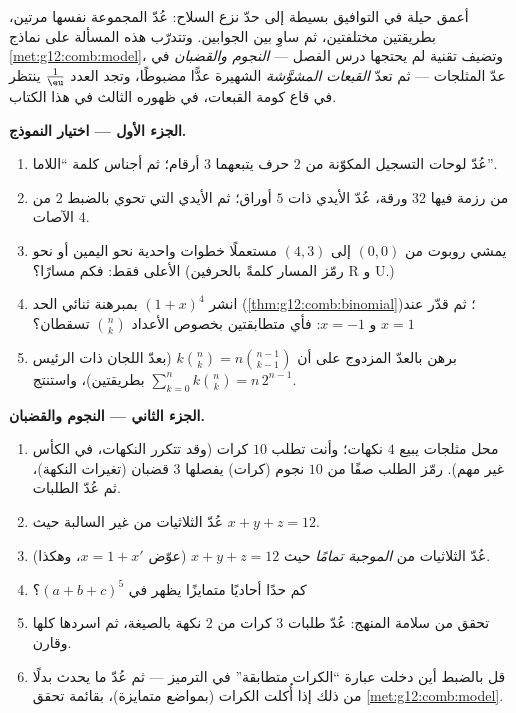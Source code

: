 \begin{problem}
\label{pb:g12:comb:1}
أعمق حيلة في التوافيق بسيطة إلى حدّ نزع السلاح: عُدّ
المجموعة نفسها مرتين، بطريقتين مختلفتين، ثم ساوِ
بين الجوابين. وتتدرّب هذه المسألة على نماذج
\cref{met:g12:comb:model}، وتضيف تقنية لم يحتجها درس
الفصل --- \emph{النجوم والقضبان} في عدّ المثلجات ---
ثم تعدّ \emph{القبعات المشوَّشة} الشهيرة عدًّا مضبوطًا،
وتجد العدد $\frac1\eu$ ينتظر في قاع كومة
القبعات، في ظهوره الثالث في هذا الكتاب.

\medskip
\noindent\textbf{الجزء الأول --- اختيار النموذج.}
\begin{enumerate}
  \item عُدّ لوحات التسجيل المكوّنة من $2$ حرف يتبعهما
        $3$ أرقام؛ ثم أجناس كلمة ``اللاما''.
  \item من رزمة فيها $32$ ورقة، عُدّ الأيدي ذات $5$ أوراق؛ ثم
        الأيدي التي تحوي بالضبط $2$ من الآصات $4$.
  \item يمشي روبوت من $(0,0)$ إلى $(4,3)$ مستعملًا خطوات
        واحدية نحو اليمين أو نحو الأعلى فقط: فكم مسارًا؟ (رمّز المسار
        كلمةً بالحرفين R و U.)
  \item انشر $(1 + x)^4$ بمبرهنة ثنائي الحد
        (\cref{thm:g12:comb:binomial})؛ ثم قدّر عند
        $x = 1$ و $x = -1$: فأي متطابقتين بخصوص
        الأعداد $\binom nk$ تسقطان؟
  \item برهن بالعدّ المزدوج على أن
        $k\binom nk = n\binom{n-1}{k-1}$ (بعدّ
        اللجان ذات الرئيس بطريقتين)، واستنتج
        $\sum_{k=0}^{n} k\binom nk = n\,2^{n-1}$.
\end{enumerate}

\medskip
\noindent\textbf{الجزء الثاني --- النجوم والقضبان.}
\begin{enumerate}[resume]
  \item محل مثلجات يبيع $4$ نكهات؛ وأنت تطلب $10$
        كرات (وقد تتكرر النكهات،  في الكأس
        غير مهم). رمّز الطلب صفًا من $10$ نجوم
        (كرات) يفصلها $3$ قضبان (تغيرات النكهة)، ثم
        عُدّ الطلبات.
  \item عُدّ الثلاثيات من  غير السالبة حيث
        $x + y + z = 12$.
  \item عُدّ الثلاثيات من  \emph{الموجبة تمامًا} حيث
        $x + y + z = 12$ (عوّض $x = 1 + x'$، وهكذا).
  \item كم حدًا أحاديًا متمايزًا يظهر في 
        $(a + b + c)^5$؟
  \item تحقق من سلامة المنهج: عُدّ طلبات $3$
        كرات من $2$ نكهة بالصيغة، ثم اسردها
        كلها وقارن.
  \item قل بالضبط أين دخلت عبارة ``الكرات متطابقة'' في
        الترميز --- ثم عُدّ ما يحدث بدلًا من ذلك إذا أُكلت
        الكرات  (بمواضع متمايزة)، بقائمة تحقق
        \cref{met:g12:comb:model}.
\end{enumerate}


\end{problem}
